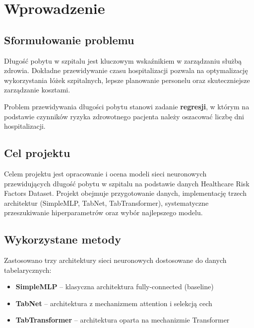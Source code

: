 \section{Wprowadzenie}

\subsection{Sformułowanie problemu}

Długość pobytu w szpitalu jest kluczowym wskaźnikiem w zarządzaniu służbą zdrowia. Dokładne przewidywanie czasu hospitalizacji pozwala na optymalizację wykorzystania łóżek szpitalnych, lepsze planowanie personelu oraz skuteczniejsze zarządzanie kosztami.

Problem przewidywania długości pobytu stanowi zadanie \textbf{regresji}, w którym na podstawie czynników ryzyka zdrowotnego pacjenta należy oszacować liczbę dni hospitalizacji.

\subsection{Cel projektu}

Celem projektu jest opracowanie i ocena modeli sieci neuronowych przewidujących długość pobytu w szpitalu na podstawie danych Healthcare Risk Factors Dataset. Projekt obejmuje przygotowanie danych, implementację trzech architektur (SimpleMLP, TabNet, TabTransformer), systematyczne przeszukiwanie hiperparametrów oraz wybór najlepszego modelu.

\subsection{Wykorzystane metody}

Zastosowano trzy architektury sieci neuronowych dostosowane do danych tabelarycznych:

\begin{itemize}
    \item \textbf{SimpleMLP} -- klasyczna architektura fully-connected (baseline)
    \item \textbf{TabNet} -- architektura z mechanizmem attention i selekcją cech
    \item \textbf{TabTransformer} -- architektura oparta na mechanizmie Transformer
\end{itemize}
